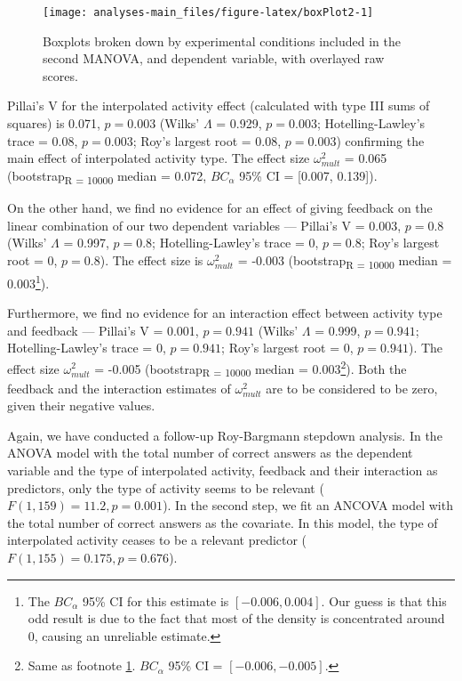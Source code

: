 \documentclass[11pt,]{article}
\let\rmarkdownfootnote\footnote%
\def\footnote{\protect\rmarkdownfootnote}
\begin{document}
\begin{figure*}[h]

{\centering \texttt{[image: analyses-main\_files/figure-latex/boxPlot2-1]} 

}

\caption{\label{box2} Boxplots broken down by experimental conditions included in the second MANOVA, and dependent variable, with overlayed raw scores.}\label{fig:boxPlot2}
\end{figure*}

Pillai's V for the interpolated activity effect (calculated with type
III sums of squares) is 0.071, \(p = 0.003\) (Wilks' \(\Lambda\) =
0.929, \(p = 0.003\); Hotelling-Lawley's trace = 0.08, \(p = 0.003\);
Roy's largest root = 0.08, \(p = 0.003\)) confirming the main effect of
interpolated activity type. The effect size \(\omega^2_{mult}\) = 0.065
(bootstrap\textsubscript{R = 10000} median = 0.072, \(BC_\alpha\) 95\%
CI = {[}0.007, 0.139{]}).

On the other hand, we find no evidence for an effect of giving feedback
on the linear combination of our two dependent variables --- Pillai's V
= 0.003, \(p = 0.8\) (Wilks' \(\Lambda\) = 0.997, \(p = 0.8\);
Hotelling-Lawley's trace = 0, \(p = 0.8\); Roy's largest root = 0,
\(p = 0.8\)). The effect size is \(\omega^2_{mult}\) = -0.003
(bootstrap\textsubscript{R = 10000} median = 0.003\footnote{
The \(BC_\alpha\) 95\% CI for this estimate is \([-0.006, 0.004]\).
Our guess is that this odd result is due to the fact that most of the density is concentrated
around 0, causing an unreliable estimate.\label{bca-ref}}).

Furthermore, we find no evidence for an interaction effect between
activity type and feedback --- Pillai's V = 0.001, \(p = 0.941\) (Wilks'
\(\Lambda\) = 0.999, \(p = 0.941\); Hotelling-Lawley's trace = 0,
\(p = 0.941\); Roy's largest root = 0, \(p = 0.941\)). The effect size
\(\omega^2_{mult}\) = -0.005 (bootstrap\textsubscript{R = 10000} median
= 0.003\footnote{
Same as footnote \ref{bca-ref}. \(BC_\alpha\) 95\% CI = \([-0.006, -0.005]\).}).
Both the feedback and the interaction estimates of \(\omega^2_{mult}\)
are to be considered to be zero, given their negative values.

Again, we have conducted a follow-up Roy-Bargmann stepdown analysis. In
the ANOVA model with the total number of correct answers as the
dependent variable and the type of interpolated activity, feedback and
their interaction as predictors, only the type of activity seems to be
relevant (\(F(1, 159) = 11.2, p = 0.001\)). In the second step, we fit
an ANCOVA model with the total number of correct answers as the
covariate. In this model, the type of interpolated activity ceases to be
a relevant predictor (\(F(1, 155) = 0.175, p = 0.676\)).
\end{document}
